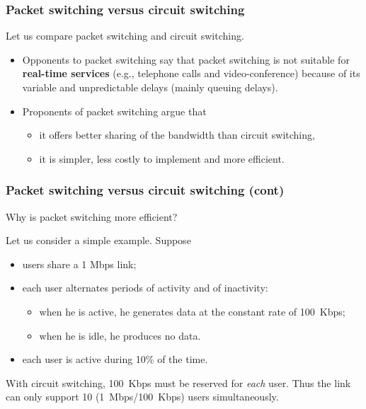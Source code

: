 %
\begin{frame}
\frametitle{Packet switching versus circuit switching}

Let us compare packet switching and circuit switching.

\begin{itemize}

  \item Opponents to packet switching say that packet switching is
  not suitable for \textbf{real-time services} (e.g., telephone calls
  and video-conference) because of its variable and unpredictable
  delays (mainly queuing delays).

  \item Proponents of packet switching argue that

  \begin{itemize}

    \item it offers better sharing of the bandwidth than circuit
    switching,

    \item it is simpler, less costly to implement and more efficient.

  \end{itemize}

\end{itemize}

\end{frame}

%
\begin{frame}
\frametitle{Packet switching versus circuit switching (cont)}

Why is packet switching more efficient?

\bigskip

Let us consider a simple example. Suppose
\begin{itemize}

  \item users share a 1 Mbps link;

  \item each user alternates periods of activity and of inactivity:

   \begin{itemize}

     \item when he is active, he generates data at the constant rate
     of 100~Kbps;

     \item when he is idle, he produces no data.

   \end{itemize}

  \item each user is active during 10\% of the time.

\end{itemize}
With circuit switching, 100~Kbps must be reserved for \emph{each}
user. Thus the link can only support 10 (1~Mbps/100~Kbps) users
simultaneously.

\end{frame}

